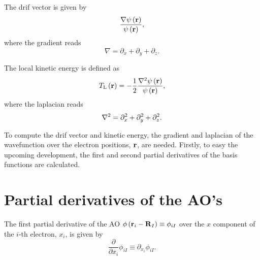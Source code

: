 The drif vector is given by 
\begin{equation} \label{eq:definition-drift-vector}
    \frac{
        \nabla \psi \left( \boldsymbol{\mathrm{r}} \right)
    }{
        \psi \left( \boldsymbol{\mathrm{r}} \right)
    }
    ,
\end{equation}
where the gradient reads
\begin{equation} \label{eq:definition-gradient}
    \nabla
    =
    \partial_x + \partial_y + \partial_z
    .
\end{equation}

The local kinetic energy is defined as 
\begin{equation} \label{eq:definition-kinetic-energy}
    T_{\mathrm{L}} \left( \mat{r} \right)
    =
    - \frac{1}{2} \frac{\laplacian \psi \left( \mat{r} \right)}{\psi \left( \mat{r} \right)}
    ,
\end{equation}
where the laplacian reads
\begin{equation} \label{eq:definition-laplacian}
    \laplacian 
    =
    \partial_x^{2} + \partial_y^{2} + \partial_z^{2}
    .
\end{equation}

To compute the drif vector and kinetic energy, the gradient and laplacian of
the wavefunction over the electron positions, $ \boldsymbol{\mathrm{r}}$, are needed.
Firstly, to easy the upcoming development, the first and second partial 
derivatives of the basis functions are calculated.

\section{Partial derivatives of the AO's}
The first partial derivative of the AO
$\phi \left( \boldsymbol{\mathrm{r}}_i - \boldsymbol{\mathrm{R}}_I \right) \equiv \phi_{iI}$
over the $x$ component of the $i$-th
electron, $x_i$, is given by 
\begin{equation}
    \frac{\partial}{\partial x_i} \phi_{iI}
    \equiv
    \partial_{x_i} \phi_{iI}
    .
\end{equation}


